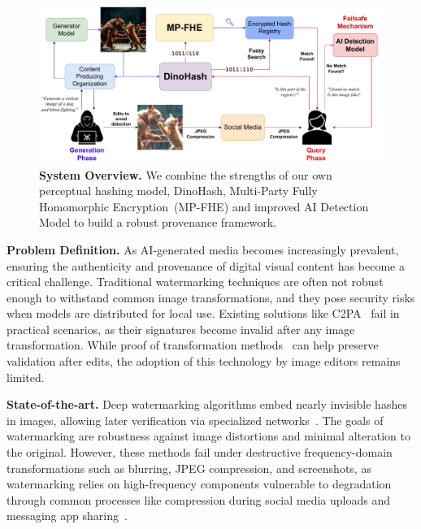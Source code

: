 \documentclass[11pt]{article}
\begin{document}
\pagebreak
\pagestyle{fancy}


\begin{figure}[!t]
    \centering
    \includegraphics[width=\textwidth]{banner.pdf}
    \caption{\textbf{System Overview.} We combine the strengths of our own perceptual hashing model, DinoHash, Multi-Party Fully Homomorphic Encryption~(MP-FHE) and improved AI Detection Model to build a robust provenance framework.}
    \label{fig:teaser}
\end{figure}

\par\noindent \textbf{Problem Definition.}  
As AI-generated media becomes increasingly prevalent, ensuring the authenticity and provenance of digital visual content has become a critical challenge. Traditional watermarking techniques are often not robust enough to withstand common image transformations, and they pose security risks when models are distributed for local use. Existing solutions like C2PA~\cite{c2pa2023} fail in practical scenarios, as their signatures become invalid after any image transformation. While proof of transformation methods~\cite{vimz, veritas} can help preserve validation after edits, the adoption of this technology by image editors remains limited. \\

\par\noindent\textbf{State-of-the-art.} Deep watermarking algorithms embed nearly invisible hashes in images, allowing later verification via specialized networks~\cite{deep_watermark}. The goals of watermarking are robustness against image distortions and minimal alteration to the original. However, these methods fail under destructive frequency-domain transformations such as blurring, JPEG compression, and screenshots, as watermarking relies on high-frequency components vulnerable to degradation through common processes like compression during social media uploads and messaging app sharing~\cite{laghari2018assessment, anwar2021image}. 
\end{document}
